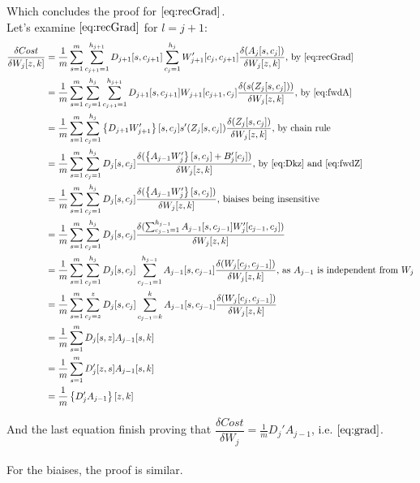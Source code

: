 \documentclass[]{article}
\begin{document}
Which concludes the proof for  $\eqref{eq:recGrad}$.\\

Let's examine $\eqref{eq:recGrad}$ for $l=j+1$:\\

\begin{align*}
\dfrac{\delta Cost}{\delta W_{j}[z,k]}&=\frac{1}{m}\sum_{s=1}^{m}\sum_{c_{j+1}=1}^{h_{j+1}}D_{j+1}[s,c_{j+1}] \sum_{c_{j}=1}^{h_{j}}W_{j+1}' [c_{j},c_{j+1}]\dfrac{\delta (A_{j}[s,c_{j}])}{\delta W_{j}[z,k]} \text{, by \eqref{eq:recGrad}}\\
&=\frac{1}{m}\sum_{s=1}^{m} \sum_{c_{j}=1}^{h_{j}}\sum_{c_{j+1}=1}^{h_{j+1}}D_{j+1}[s,c_{j+1}]W_{j+1} [c_{j+1},c_{j}]\dfrac{\delta (s(Z_{j}[s,c_{j}]))}{\delta W_{j}[z,k]} \text{, by $\eqref{eq:fwdA}$}\\
&=\frac{1}{m}\sum_{s=1}^{m} \sum_{c_{j}=1}^{h_{j}} \left\lbrace D_{j+1}W_{j+1}'  \right\rbrace [s,c_{j}] s'(Z_{j}[s,c_{j}])\dfrac{\delta (Z_{j}[s,c_{j}])}{\delta W_{j}[z,k]} \text{, by chain rule}\\
&=\frac{1}{m}\sum_{s=1}^{m} \sum_{c_{j}=1}^{h_{j}} D_{j} [s,c_{j}]\dfrac{\delta ( \left\lbrace A_{j-1}W_{j}' \right\rbrace [s,c_{j}] + B_{j}'[c_{j}])}{\delta W_{j}[z,k]} \text{, by $\eqref{eq:Dkz}$ and $\eqref{eq:fwdZ}$}\\
&=\frac{1}{m}\sum_{s=1}^{m} \sum_{c_{j}=1}^{h_{j}} D_{j} [s,c_{j}]\dfrac{\delta ( \left\lbrace A_{j-1}W_{j}' \right\rbrace [s,c_{j}] )}{\delta W_{j}[z,k]} \text{, biaises being insensitive}\\
&=\frac{1}{m}\sum_{s=1}^{m} \sum_{c_{j}=1}^{h_{j}} D_{j} [s,c_{j}]\dfrac{\delta (\sum_{c_{j-1}=1}^{h_{j-1}} A_{j-1}[s,c_{j-1}]W_{j}'  [c_{j-1},c_{j}] )}{\delta W_{j}[z,k]}\\
&=\frac{1}{m}\sum_{s=1}^{m} \sum_{c_{j}=1}^{h_{j}} D_{j} [s,c_{j}]\sum_{c_{j-1}=1}^{h_{j-1}} A_{j-1}[s,c_{j-1}] \dfrac{\delta ( W_{j}  [c_{j},c_{j-1}] )}{\delta W_{j}[z,k]} \text{, as $A_{j-1}$ is independent from $W_j$}\\
&=\frac{1}{m}\sum_{s=1}^{m} \sum_{c_{j}=z}^{z} D_{j} [s,c_{j}]\sum_{c_{j-1}=k}^{k} A_{j-1}[s,c_{j-1}] \dfrac{\delta ( W_{j}  [c_{j},c_{j-1}] )}{\delta W_{j}[z,k]}\\
&=\frac{1}{m}\sum_{s=1}^{m}  D_{j} [s,z] A_{j-1}[s,k]\\
&=\frac{1}{m}\sum_{s=1}^{m}  D_{j}' [z,s] A_{j-1}[s,k]\\
&=\frac{1}{m} \left\lbrace D_{j}'  A_{j-1}\right\rbrace [z,k]\\
\end{align*}

And the last equation finish proving  that $\dfrac{\delta Cost}{\delta W_{j}}=\frac{1}{m}   D_{j}'  A_{j-1}$, i.e. $\eqref{eq:grad}$.\\
\\
For the biaises, the proof is similar.\\
\end{document}
